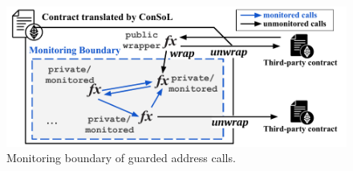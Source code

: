 \begin{figure}[t]
	\centering
	\includegraphics[width=0.85\linewidth]{monitoring_boundary.pdf}
	\vspace{-1mm}
	\caption{Monitoring boundary of guarded address calls.}
	\label{fig:monitor_bound}
\end{figure}